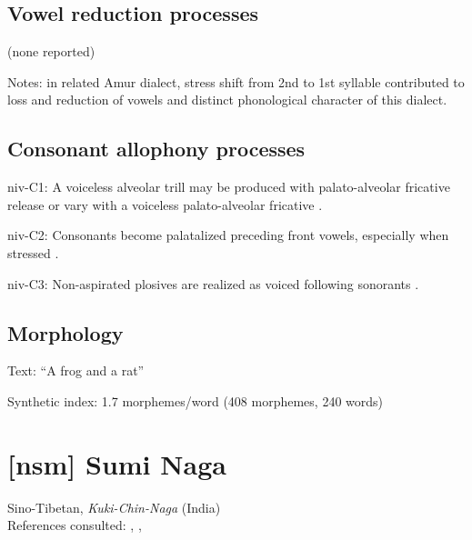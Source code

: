 {\subsection*{Vowel reduction processes}

(none reported)
\begin{appendixdesc}
\item[Notes:] in related Amur dialect, stress shift from 2nd to 1st syllable contributed to loss and reduction of vowels and distinct phonological character of this dialect.
\end{appendixdesc}
\subsection*{Consonant allophony processes}
\begin{appendixdesc}

\item[niv-C1:] A voiceless alveolar trill may be produced with palato-alveolar fricative release or vary with a voiceless palato-alveolar fricative \citep[26]{Shiraishi2006}.

\item[niv-C2:] Consonants become palatalized preceding front vowels, especially when stressed \citep[23]{Shiraishi2006}.

\item[niv-C3:] Non-aspirated plosives are realized as voiced following sonorants \citep[25]{Shiraishi2006}.
\end{appendixdesc}
\subsection*{Morphology}

\begin{appendixdesc}

\item[Text:] “A frog and a rat” \citep[58--61]{Gruzdeva1998}

\item[Synthetic index:] 1.7 morphemes/word (408 morphemes, 240 words)
\end{appendixdesc}
\section*{[nsm] Sumi Naga}   %
Sino-Tibetan, \textit{Kuki-Chin-Naga} (India)\medskip\\
References consulted: \citet{Sreedhar1980}, \citet{Teo2009}, \citet{Teo2012}

}
